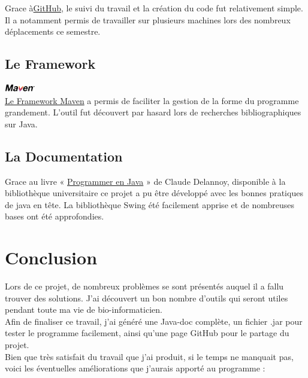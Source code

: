 \documentclass[titlepage]{report}
\begin{document}
Grace à\href{https://github.com/}{GitHub}, le suivi du travail et la création du code fut relativement simple. Il a notamment permis de travailler sur plusieurs machines lors des nombreux déplacements ce semestre. 
\section{Le Framework}
\includegraphics[width=0.1\textwidth]{img/maven_logo.png}\\

\href{https://maven.apache.org/}{Le Framework Maven} a permis de faciliter la gestion de la forme du programme grandement. L’outil fut découvert par hasard lors de recherches bibliographiques sur Java. 
\section{La Documentation}
Grace au livre « \href{https://babordplus.hosted.exlibrisgroup.com/primo-explore/fulldisplay?vid=33PUDB_UB_VU1&id=991003988839704672&inst=33PUDB_UB&context=L}{Programmer en Java} » de Claude Delannoy, disponible à la bibliothèque universitaire ce projet a pu être développé avec les bonnes pratiques de java en tête. La bibliothèque Swing été facilement apprise et de nombreuses bases ont été approfondies. 

\chapter{Conclusion}    
Lors de ce projet, de nombreux problèmes se sont présentés auquel il a fallu trouver des solutions. J’ai découvert un bon nombre d’outils qui seront utiles pendant toute ma vie de bio-informaticien. \\

Afin de finaliser ce travail, j’ai généré une Java-doc complète, un fichier .jar pour tester le programme facilement, ainsi qu’une page GitHub pour le partage du projet. \\

Bien que très satisfait du travail que j’ai produit, si le temps ne manquait pas, voici les éventuelles améliorations que j’aurais apporté au programme : 
\end{document}
